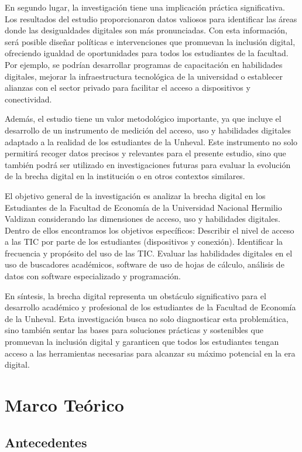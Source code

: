 \documentclass[12pt, a4paper]{article}
\begin{document}
En segundo lugar, la investigación tiene una implicación práctica significativa. Los resultados del estudio proporcionaron datos valiosos para identificar las áreas donde las desigualdades digitales son más pronunciadas. Con esta información, será posible diseñar políticas e intervenciones que promuevan la inclusión digital, ofreciendo igualdad de oportunidades para todos los estudiantes de la facultad. Por ejemplo, se podrían desarrollar programas de capacitación en habilidades digitales, mejorar la infraestructura tecnológica de la universidad o establecer alianzas con el sector privado para facilitar el acceso a dispositivos y conectividad.

Además, el estudio tiene un valor metodológico importante, ya que incluye el desarrollo de un instrumento de medición del acceso, uso y habilidades digitales adaptado a la realidad de los estudiantes de la Unheval. Este instrumento no solo permitirá recoger datos precisos y relevantes para el presente estudio, sino que también podrá ser utilizado en investigaciones futuras para evaluar la evolución de la brecha digital en la institución o en otros contextos similares.

El objetivo general de la investigación es analizar la brecha digital en los Estudiantes de la Facultad de Economía de la Universidad Nacional Hermilio Valdizan considerando las dimensiones de acceso, uso y habilidades digitales. Dentro de ellos encontramos los objetivos específicos: Describir el nivel de acceso a las TIC por parte de los estudiantes (dispositivos y conexión). Identificar la frecuencia y propósito del uso de las TIC. Evaluar las habilidades digitales en el uso de buscadores académicos, software de uso de hojas de cálculo, análisis de datos con software especializado y programación.

En síntesis, la brecha digital representa un obstáculo significativo para el desarrollo académico y profesional de los estudiantes de la Facultad de Economía de la Unheval. Esta investigación busca no solo diagnosticar esta problemática, sino también sentar las bases para soluciones prácticas y sostenibles que promuevan la inclusión digital y garanticen que todos los estudiantes tengan acceso a las herramientas necesarias para alcanzar su máximo potencial en la era digital.

\section{Marco Teórico}
\subsection{Antecedentes}
\end{document}
